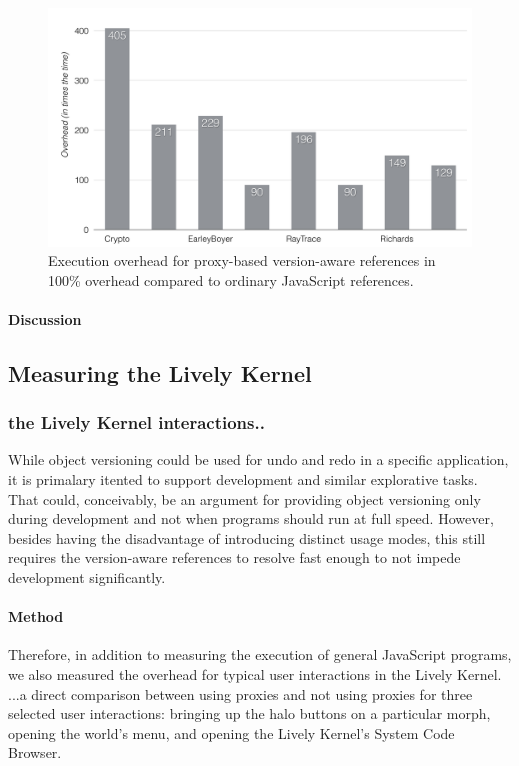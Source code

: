 \begin{figure}[h]
    \centering
    \includegraphics[width=\textwidth]{figures/6_evaluation/2_executionOverhead.pdf}
    \caption{Execution overhead for proxy-based version-aware references in 100\% overhead compared to ordinary JavaScript references.}
    \label{fig:ExecutionOverhead}
\end{figure}

\paragraph{Discussion}



\subsection{Measuring the Lively Kernel}

\subsubsection{the Lively Kernel interactions..}

While object versioning could be used for undo and redo in a specific application, it is primalary itented to support development and similar explorative tasks.
That could, conceivably, be an argument for providing object versioning only during development and not when programs should run at full speed.
However, besides having the disadvantage of introducing distinct usage modes, this still requires the version-aware references to resolve fast enough to not impede development significantly.

\paragraph{Method}
Therefore, in addition to measuring the execution of general JavaScript programs, we also measured the overhead for typical user interactions in the Lively Kernel.
...a direct comparison between using proxies and not using proxies for three selected user interactions: bringing up the halo buttons on a particular morph, opening the world's menu, and opening the Lively Kernel's System Code Browser.


